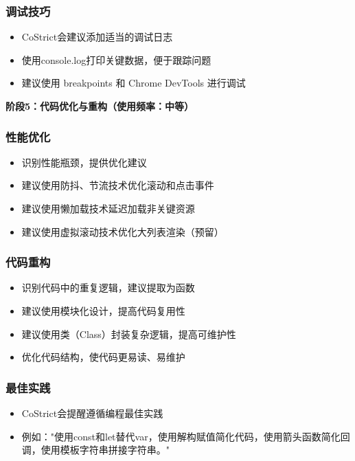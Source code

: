 \documentclass[12pt,a4paper]{article}
\begin{document}
\subsubsection{调试技巧}
\begin{itemize}
    \item CoStrict会建议添加适当的调试日志
    \item 使用console.log打印关键数据，便于跟踪问题
    \item 建议使用 breakpoints 和 Chrome DevTools 进行调试
\end{itemize}

\textbf{阶段5：代码优化与重构（使用频率：中等）}

\subsubsection{性能优化}
\begin{itemize}
    \item 识别性能瓶颈，提供优化建议
    \item 建议使用防抖、节流技术优化滚动和点击事件
    \item 建议使用懒加载技术延迟加载非关键资源
    \item 建议使用虚拟滚动技术优化大列表渲染（预留）
\end{itemize}

\subsubsection{代码重构}
\begin{itemize}
    \item 识别代码中的重复逻辑，建议提取为函数
    \item 建议使用模块化设计，提高代码复用性
    \item 建议使用类（Class）封装复杂逻辑，提高可维护性
    \item 优化代码结构，使代码更易读、易维护
\end{itemize}

\subsubsection{最佳实践}
\begin{itemize}
    \item CoStrict会提醒遵循编程最佳实践
    \item 例如："使用const和let替代var，使用解构赋值简化代码，使用箭头函数简化回调，使用模板字符串拼接字符串。"
\end{itemize}
\end{document}
